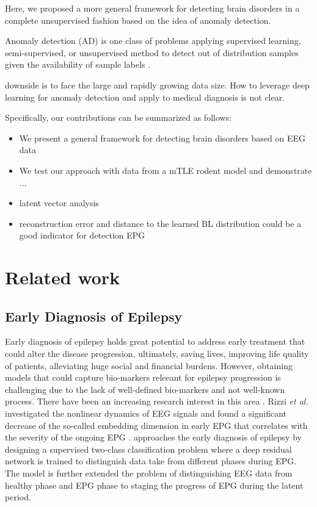 \documentclass{article}
\begin{document}
	Here, we proposed a more general framework for detecting brain disorders in a complete unsupervised fashion based on the idea of anomaly detection.
	
	Anomaly detection (AD) is one class of problems applying supervised learning, semi-supervised, or unsupervised method to detect out of distribution samples given the availability of sample labels \cite{NEURIPS2019_805163a0}.
	
	downside is to face the large and rapidly growing data size.
	How to leverage deep learning for anomaly detection and apply to medical diagnosis is not clear.
	
	
	Specifically, our contributions can be summarized as follows:
	\begin{itemize}
		\item We present a general framework for detecting brain disorders based on EEG data
		\item We test our approach with data from a mTLE rodent model and demonstrate ... 
		\item latent vector analysis 
		\item reconstruction error and distance to the learned BL distribution could be a good indicator for detection EPG
	\end{itemize}
	
	
	
	\section{Related work}
	\subsection{Early Diagnosis of Epilepsy}
	Early diagnosis of epilepsy holds great potential to address early treatment that could alter the disease progression, ultimately, saving lives, improving life quality of patients, alleviating huge social and financial burdens. However, obtaining models that could capture bio-markers releeant for epilepsy progression is challenging due to the lack of well-defined bio-markers and not well-known process. There have been an increasing research interest in this area \cite{lu2020towards, lu2020staging, rizzi2019changes}. Rizzi \textit{et al.} investigated the nonlinear dynamics of EEG signals and found a significant decrease of the so-called embedding dimension in early EPG that correlates with the severity of the ongoing EPG \cite{rizzi2019changes}.
	\cite{lu2020towards} approaches the early diagnosis of epilepsy by designing a supervised two-class classification problem where a deep residual network is trained to distinguish data take from different phases during EPG. The model is 
	\cite{lu2020staging} further extended the problem of distinguishing EEG data from healthy phase and EPG phase to staging the progress of EPG during the latent period.
	
\end{document}
